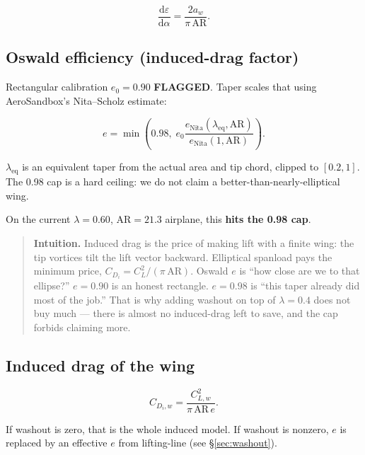 \documentclass[11pt,letterpaper]{article}
\newcommand{\flag}{\textcolor{red!60!black}{\textbf{FLAGGED}}}
\newenvironment{intuition}{\begin{quote}\small}{\end{quote}}
\begin{document}
\begin{equation}
  \frac{\mathrm{d}\varepsilon}{\mathrm{d}\alpha} = \frac{2 a_w}{\pi\,\mathrm{AR}}.
\end{equation}

\subsection{Oswald efficiency (induced-drag factor)}

Rectangular calibration $e_0 = 0.90$ \flag{}. Taper scales that using AeroSandbox's Nita--Scholz estimate:

\begin{equation}
  e = \min\left(0.98,\;
      e_0 \frac{e_\mathrm{Nita}(\lambda_\mathrm{eq},\mathrm{AR})}
               {e_\mathrm{Nita}(1,\mathrm{AR})}\right).
\end{equation}

$\lambda_\mathrm{eq}$ is an equivalent taper from the actual area and tip chord, clipped to $[0.2, 1]$. The 0.98 cap is a hard ceiling: we do not claim a better-than-nearly-elliptical wing.

On the current $\lambda = 0.60$, $\mathrm{AR} = 21.3$ airplane, this \textbf{hits the 0.98 cap}.

\begin{intuition}
\textbf{Intuition.} Induced drag is the price of making lift with a finite wing: the tip vortices tilt the lift vector backward. Elliptical spanload pays the minimum price, $C_{D_i} = C_L^2/(\pi\,\mathrm{AR})$. Oswald $e$ is ``how close are we to that ellipse?'' $e=0.90$ is an honest rectangle. $e=0.98$ is ``this taper already did most of the job.'' That is why adding washout on top of $\lambda=0.4$ does not buy much --- there is almost no induced-drag left to save, and the cap forbids claiming more.
\end{intuition}

\subsection{Induced drag of the wing}

\begin{equation}
  C_{D_i,w} = \frac{C_{L,w}^2}{\pi\,\mathrm{AR}\, e}.
\label{eq:cdi}
\end{equation}

If washout is zero, that is the whole induced model. If washout is nonzero, $e$ is replaced by an effective $e$ from lifting-line (see \S\ref{sec:washout}).
\end{document}
